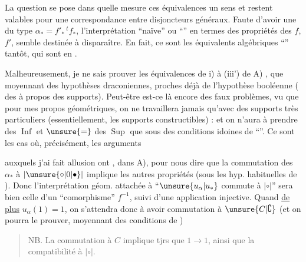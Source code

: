 
La question se pose dans quelle mesure ces équivalences   un sens et restent valables pour une correspondance entre disjoncteurs généraux. Faute d'avoir une  du type $\alpha_*=f'_*\,{}^{t}f_*$,  l'interprétation ``naïve'' ou ``'' en termes des propriétés des $f$, $f'$,  semble destinée à disparaître. En fait, ce sont les équivalents algébriques ``'' tantôt, qui sont en .

Malheureusement, je ne sais prouver les équivalences de i) à (iii') de A) , que moyennant des hypothèses draconiennes, proches déjà de l'hypothèse booléenne (    des  à propos des supports). Peut-être est-ce là encore des faux problèmes, vu que pour mes propos géométriques, on ne travaillera jamais qu'avec des supports très particuliers (essentiellement, les supports constructibles) : et on n'aura à prendre des $\operatorname{Inf}$ et $\unsure{=}$ des $\operatorname{Sup}$ que sous des conditions idoines de ``''. Ce sont les cas où, précisément, les arguments


auxquels j'ai fait allusion ont , dans A), pour nous dire que la commutation des $\alpha_*$ à $|\unsure{\circ|0|\bullet}|$ implique les autres propriétés (sous les hyp. habituelles de ). Donc l'interprétation géom. attachée à ``$\unsure{u_\alpha|u_*}$ commute à $|\circ|$'' sera bien celle d'un ``comorphisme'' $f^{-1}$, suivi d'une application injective. Quand \uline{de plus} $u_\alpha(1)=1$, on s'attendra donc à avoir commutation à $\unsure{C|\complement}$ (et on pourra le prouver, moyennant des conditions de  )

\begin{quote}
\noindent\vrule\quad\begin{minipage}{0.88\linewidth}
NB. La commutation à $C$ implique tjrs que $1\longrightarrow1$, ainsi que la compatibilité à $|\circ|$.
\end{minipage}
\end{quote}

